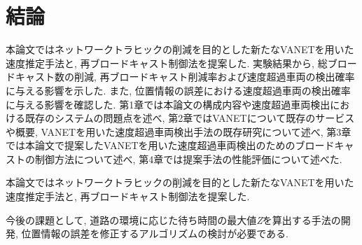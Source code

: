 \documentclass[10pt]{jreport}
\begin{document}
\chapter{結論}
本論文ではネットワークトラヒックの削減を目的とした新たなVANETを用いた速度推定手法と, 再ブロードキャスト制御法を提案した. 実験結果から, 総ブロードキャスト数の削減, 再ブロードキャスト削減率および速度超過車両の検出確率に与える影響を示した. また, 位置情報の誤差における速度超過車両の検出確率に与える影響を確認した. 第1章では本論文の構成内容や速度超過車両検出における既存のシステムの問題点を述べ, 第2章ではVANETについて既存のサービスや概要, VANETを用いた速度超過車両検出手法の既存研究について述べ, 第3章では本論文で提案したVANETを用いた速度超過車両検出のためのブロードキャストの制御方法について述べ, 第4章では提案手法の性能評価について述べた.

本論文ではネットワークトラヒックの削減を目的とした新たなVANETを用いた速度推定手法と, 再ブロードキャスト制御法を提案した.

今後の課題として, 道路の環境に応じた待ち時間の最大値{\it Z}を算出する手法の開発, 位置情報の誤差を修正するアルゴリズムの検討が必要である.
\end{document}
